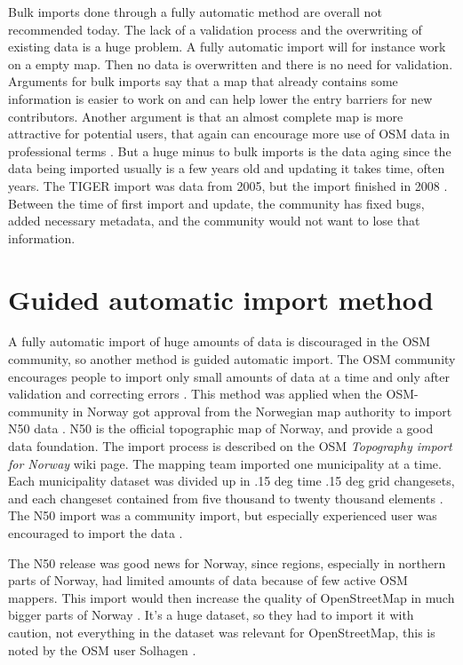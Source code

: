 Bulk imports done through a fully automatic method are overall not recommended today. The lack of a validation process and the overwriting of existing data is a huge problem. A fully automatic import will for instance work on a empty map. Then no data is overwritten and there is no need for validation. Arguments for bulk imports say that a map that already contains some information is easier to work on and can help lower the entry barriers for new contributors. Another argument is that an almost complete map is more attractive for potential users, that again can encourage more use of OSM data in professional terms \cite{Exelvan2010}. But a huge minus to bulk imports is the data aging since the data being imported usually is a few years old and updating it takes time, often years. The TIGER import was data from 2005, but the import finished in 2008 \cite{Zielstra2013}. Between the time of first import and update, the community has fixed bugs, added necessary metadata, and the community would not want to lose that information. 

\section{Guided automatic import method}\label{guidedautoimp}
A fully automatic import of huge amounts of data is discouraged in the OSM community, so another method is guided automatic import. The OSM community encourages people to import only small amounts of data at a time and only after validation and correcting errors \cite{Mehus2014}. This method was applied when the OSM-community in Norway got approval from the Norwegian map authority to import N50 data \cite{Kihle2014}. N50 is the official topographic map of Norway, and provide a good data foundation. The import process is described on the OSM \textit{Topography import for Norway} wiki page. The mapping team imported one municipality at a time. Each municipality dataset was divided up in .15 deg time .15 deg grid changesets, and each changeset contained from five thousand to twenty thousand elements \cite{OSMN502014}. The N50 import was a community import, but especially experienced user was encouraged to import the data \cite{Mehus2014}. 

The N50 release was good news for Norway, since regions, especially in northern parts of Norway, had limited amounts of data because of few active OSM mappers. This import would then increase the quality of OpenStreetMap in much bigger parts of Norway \cite{Jorgenrud2013}. It's a huge dataset, so they had to import it with caution, not everything in the dataset was relevant for OpenStreetMap, this is noted by the OSM user Solhagen \cite{Solhagen2015}.

